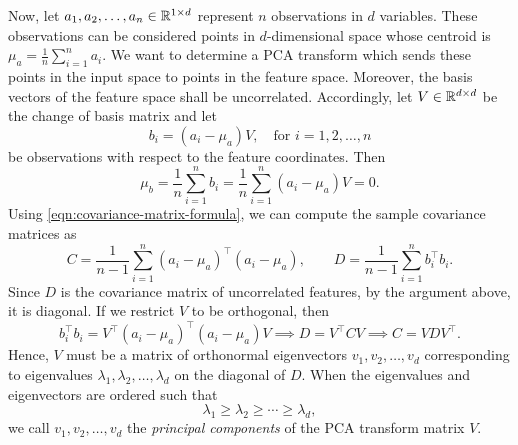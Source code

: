 Now, let \(a_1, a_2, \dots, a_n \in \mathbb{R}^{1 \times d}\) represent \(n\) observations in \(d\) variables.
These observations can be considered points in \(d\)-dimensional space whose centroid is \(\mu_a = \frac{1}{n} \sum_{i=1}^{n} a_i\).
We want to determine a PCA transform which sends these points in the input space to points in the feature space.
Moreover, the basis vectors of the feature space shall be uncorrelated.
Accordingly, let \(V \in \mathbb{R}^{d \times d}\) be the change of basis matrix and let
\begin{equation}
    \label{eqn:transformed-points}
    b_i = (a_i - \mu_a) V, \quad \text{for \(i = 1, 2, \dots, n\)}
\end{equation}
be observations with respect to the feature coordinates.
Then
\begin{equation}
    \mu_b
    = \frac{1}{n} \sum_{i=1}^{n} b_i
    = \frac{1}{n} \sum_{i=1}^{n} (a_i - \mu_a) V
    = 0.
\end{equation}
Using \cref{eqn:covariance-matrix-formula}, we can compute the sample covariance matrices as 
\begin{equation}
    \label{eqn:covariance-matrix-pca}
    C = \frac{1}{n-1} \sum_{i=1}^{n} (a_i - \mu_a)^\top (a_i - \mu_a),
    \qquad
    D = \frac{1}{n-1} \sum_{i=1}^{n} b_i^\top b_i.
\end{equation}
Since \(D\) is the covariance matrix of uncorrelated features, by the argument above, it is diagonal.
If we restrict \(V\) to be orthogonal, then
\begin{equation}
    \label{eqn:diagonalize-covariance}
    b_i^\top b_i = V^\top (a_i - \mu_a)^\top (a_i - \mu_a) V
    \implies
    D = V^\top C V
    \implies
    C = V D V^\top.
\end{equation}
Hence, \(V\) must be a matrix of orthonormal eigenvectors \(v_1, v_2, \dots, v_d\) corresponding to eigenvalues \(\lambda_1, \lambda_2, \dots, \lambda_d\) on the diagonal of \(D\).
When the eigenvalues and eigenvectors are ordered such that
\begin{equation}
    \lambda_1 \geq \lambda_2 \geq \cdots \geq \lambda_d,
\end{equation}
we call \(v_1, v_2, \dots, v_d\) the \textit{principal components} of the PCA transform matrix \(V\).

